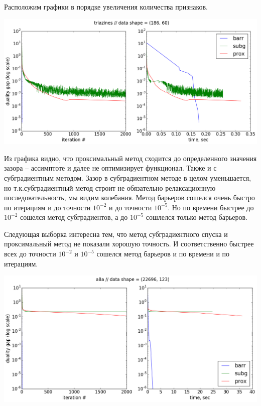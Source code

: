 \documentclass[12pt, a4paper]{article}
\begin{document}
    Расположим графики в порядке увеличения количества признаков.
    \def \picwidth {17.5cm}
    \begin{center}\includegraphics[width=\picwidth]{triazines.png}\end{center}

    Из графика видно, что проксимальный метод сходится до определенного значения зазора -- ассимптоте и далее не оптимизирует функционал. Также и с субградиентным методом.
    Зазор в субградиентном методе в целом уменьшается, но т.к.субградиентный метод строит не обязательно релаксационную последовательность, мы видим колебания.
    Метод барьеров сошелся очень быстро по итерациям и до точности $10^{-2}$ и до точности $10^{-5}$. Но по времени быстрее до $10^{-2}$ сошелся метод субградиентов, а до $10^{-5}$
    сошлелся только метод барьеров.

    Следующая выборка интересна тем, что метод субградиентного спуска и проксимальный метод не показали хорошую точность. И соответственно быстрее всех до точности $10^{-2}$ и $10^{-5}$
    сошелся метод барьеров и по времени и по итерациям.

    \begin{center}\includegraphics[width=\picwidth]{a8a.png}\end{center}
\end{document}
